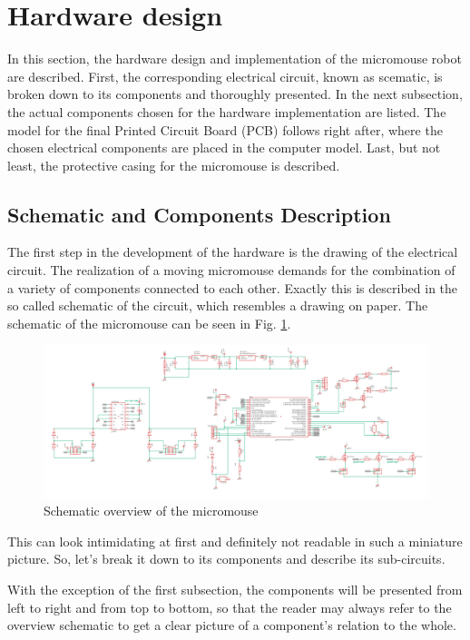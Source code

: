 \section{Hardware design}

In this section, the hardware design and implementation of the micromouse robot are described. First, the corresponding electrical circuit, known as scematic, is broken down to its components and thoroughly presented. In the next subsection, the actual components chosen for the hardware implementation are listed. The model for the final Printed Circuit Board (PCB) follows right after, where the chosen electrical components are placed in the computer model. Last, but not least, the protective casing for the micromouse is described.

\subsection{Schematic and Components Description}

The first step in the development of the hardware is the drawing of the electrical circuit. The realization of a moving micromouse demands for the combination of a variety of components connected to each other. Exactly this is described in the so called schematic of the circuit, which resembles a drawing on paper. 
The schematic of the micromouse can be seen in Fig. \ref{fig:schematic_overview}.

\begin{figure}[htb]
    \centering
    \includegraphics[width=1\textwidth]{figures/hardware/Schematic.PNG}
    \caption{Schematic overview of the micromouse}
    \label{fig:schematic_overview}
\end{figure}

This can look intimidating at first and definitely not readable in such a miniature picture. So, let's break it down to its components and describe its sub-circuits.

With the exception of the first subsection, the components will be presented from left to right and from top to bottom, so that the reader may always refer to the overview schematic to get a clear picture of a component's relation to the whole.

